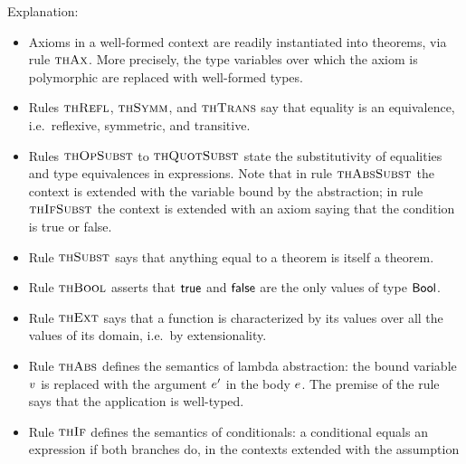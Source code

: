 Explanation:
\begin{itemize}
\item
Axioms in a well-formed context are readily instantiated into theorems, via
rule $\textsc{thAx}$. More precisely, the type variables over which the axiom is
polymorphic are replaced with well-formed types.
\item
Rules $\textsc{thRefl}$, $\textsc{thSymm}$, and $\textsc{thTrans}$ say that equality is an
equivalence, i.e.\ reflexive, symmetric, and transitive.
\item
Rules $\textsc{thOpSubst}$ to $\textsc{thQuotSubst}$ state the substitutivity of equalities and
type equivalences in expressions. Note that in rule $\textsc{thAbsSubst}$ the context
is extended with the variable bound by the abstraction; in rule $\textsc{thIfSubst}$
the context is extended with an axiom saying that the condition is true or
false.
\item
Rule $\textsc{thSubst}$ says that anything equal to a theorem is itself a theorem.
\item
Rule $\textsc{thBool}$ asserts that $\mathsf{true}$ and $\mathsf{false}$ are the only values of type
$\mathsf{Bool}$.
\item
Rule $\textsc{thExt}$ says that a function is characterized by its values over all
the values of its domain, i.e.\ by extensionality.
\item
Rule $\textsc{thAbs}$ defines the semantics of lambda abstraction: the bound variable
$v$ is replaced with the argument $e'$ in the body $e$. The premise
of the rule says that the application is well-typed.
\item
Rule $\textsc{thIf}$ defines the semantics of conditionals: a conditional equals an
expression if both branches do, in the contexts extended with the assumption

\end{itemize}
